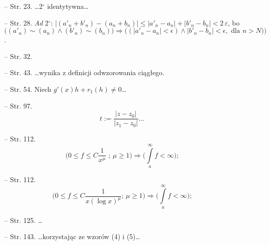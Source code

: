 \begin{itemize}
\item[--] Str. 23. \ldots 2$^{ \circ }$ identytywna\ldots
\item[--] Str. 28. \emph{Ad} 2$^{ \circ }$: $| ( a'_{ n } + b'_{ n } ) - ( a_{ n } + b_{ n } ) |  \leq | a'_{ n } - a_{ n } | + | b'_{ n } - b_{ n } | <2 \, \varepsilon$, bo\\
  $\big( ( a'_{ n } ) \sim ( a_{ n } ) \wedge( b'_{ n } ) \sim ( b_{ n
  } ) \big) \Rightarrow \big( ( | a'_{ n } - a_{ n } | < \epsilon )
  \wedge | b'_{ n } - b_{ n } | < \epsilon, \textrm{ dla } n > N )
  \big)$.
\item[--] Str. 32.
\item[--] Str. 43. \ldots wynika z definicji odwzorowania ciągłego.
\item[--] Str. 54. Niech $g'( x ) h + r_{ 1 }( h ) \neq 0$\ldots
\item[--] Str.
  97.$$t := \frac{ | z - z_{ 0 } | }{ | z_{ 1 } - z_{ 0 } | }
  \textrm{\ldots}$$
\item[--] Str. 112.
  $$\big( 0 \leq f \leq C \frac{ 1 }{ x^{ \mu } } \textrm{ ; } \mu
  \geq 1 \big) \Rightarrow \big( \int \limits^{ \infty }_{ a } f <
  \infty \big) \textrm{;}$$
\item[--] Str. 112.
  $$\big( 0 \leq f \leq C \frac{ 1 }{ x ( \log x )^{ \mu } } \textrm{
    ; } \mu \geq 1 \big) \Rightarrow \big( \int \limits^{ \infty }_{ a
  } f < \infty \big) \textrm{;}$$
\item[--] Str. 125. \ldots
\item[--] Str. 143. \ldots korzystając ze wzorów (4) i (5)\ldots
\end{itemize}











